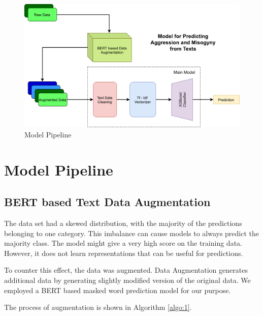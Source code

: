 \documentclass[conference]{IEEEtran}
\begin{document}
\begin{figure}[t!]
    \begin{center}
        \includegraphics[scale=0.7]{assets/nn-1.png}
        \caption{Model Pipeline}
        \label{fig:pipeline}
    \end{center}
\end{figure}
\section{Model Pipeline}

\subsection{BERT based Text Data Augmentation}\label{subsec-bert-aug}
The data set had a skewed distribution, with the majority of the predictions belonging to one category. This imbalance can cause models to always predict the majority class. The model might give a very high score on the training data. However, it does not learn representations that can be useful for predictions. 

To counter this effect, the data was augmented. Data Augmentation generates additional data by generating slightly modified version of the original data. We employed a BERT based masked word prediction model for our purpose.

The process of augmentation is shown in Algorithm \eqref{algo:1}.
\end{document}

